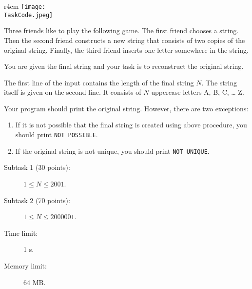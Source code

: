 \documentclass{boi2014}
\renewcommand{\TaskCode}{friends}
\begin{document}
    \begin{wrapfigure}{r}{4cm}
        \vspace{-24pt}
		\texttt{[image: \\TaskCode.jpeg]}
	\end{wrapfigure}
    Three friends like to play the following game.
    The first friend chooses a string.
    Then the second friend constructs a new string that consists of
    two copies of the original string. 
    Finally, the third friend inserts one letter somewhere in the string.

    \Task
    You are given the final string and your task is to reconstruct the original
    string.

    \Input
    The first line of the input contains the length of the final string $N$.
    The string itself is given on the second line. It consists of $N$
    uppercase letters A, B, C, \ldots{} Z.

    \Output
    Your program should print the original string.
    However, there are two exceptions:
    \begin{enumerate}
        \item If it is not possible that the final string is created using above
        procedure, you should print {\tt NOT POSSIBLE}.
        \item If the original string is not unique, you should print {\tt NOT
        UNIQUE}.
    \end{enumerate}
    

    \Examples


    \Scoring

    \begin{description}
        \item[Subtask 1 (30 points):] $1 \le N \le 2001$.
        \item[Subtask 2 (70 points):] $1 \le N \le 2000001$.
    \end{description}

    \Constraints

    \begin{description}
        \item[Time limit:] 1 s.
        \item[Memory limit:] 64 MB.
    \end{description}
\end{document}

